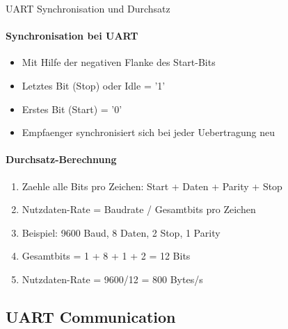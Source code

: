 \begin{KR}{UART Synchronisation und Durchsatz}\\
    \paragraph{Synchronisation bei UART}
    \begin{itemize}
        \item Mit Hilfe der negativen Flanke des Start-Bits
        \item Letztes Bit (Stop) oder Idle = '1'
        \item Erstes Bit (Start) = '0'
        \item Empfaenger synchronisiert sich bei jeder Uebertragung neu
    \end{itemize}
    
    \paragraph{Durchsatz-Berechnung}
    \begin{enumerate}
        \item Zaehle alle Bits pro Zeichen: Start + Daten + Parity + Stop
        \item Nutzdaten-Rate = Baudrate / Gesamtbits pro Zeichen
        \item Beispiel: 9600 Baud, 8 Daten, 2 Stop, 1 Parity
        \item Gesamtbits = 1 + 8 + 1 + 2 = 12 Bits
        \item Nutzdaten-Rate = 9600/12 = 800 Bytes/s
    \end{enumerate}
\end{KR}



\subsection{UART Communication}

